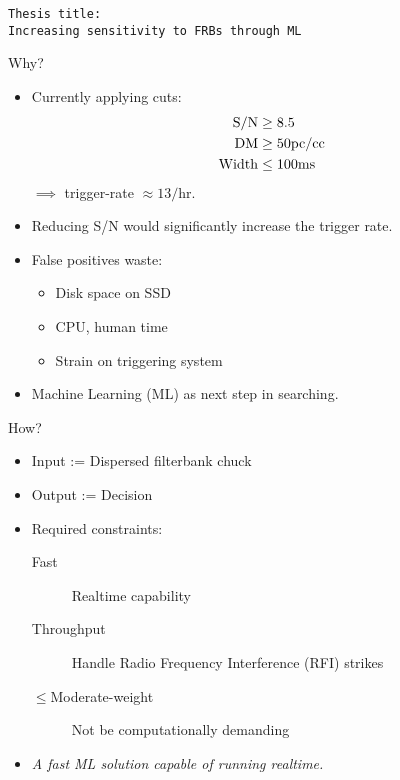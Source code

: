 

\begin{frame}
\begin{center}
\vspace*{\vfill}
\texttt{\large Thesis title:}\\
\texttt{\Huge Increasing sensitivity to FRBs through ML}
\vspace*{\vfill}
\end{center}
\end{frame}

\begin{frame}{Why?}
\begin{itemize}
		\item Currently applying cuts: 
		\begin{align}
			{\rm S/N} &\geq 8.5 \\
			{\rm DM}  &\geq 50 {\rm pc/cc} \\
			{\rm Width} &\leq 100 {\rm ms}
		\end{align} $\implies$ trigger-rate $\approx 13/$hr.
		\item Reducing S/N would significantly increase the trigger rate.
		\item False positives waste: \begin{itemize}
			\item Disk space on SSD
			\item CPU, human time
			\item Strain on triggering system
		\end{itemize}
	\item Machine Learning (ML) as next step in searching.
\end{itemize}
\end{frame}

\begin{frame}{How?}
\begin{itemize}
	\item Input  := Dispersed filterbank chuck
	\item Output := Decision
	\item Required constraints: 
		\begin{description}
		\item[Fast] Realtime capability
		\item[Throughput] Handle Radio Frequency Interference (RFI) strikes
		\item[$\leq$Moderate-weight] Not be computationally demanding
		\end{description}
	\item \emph{A fast ML solution capable of running realtime.}
\end{itemize}
\end{frame}

